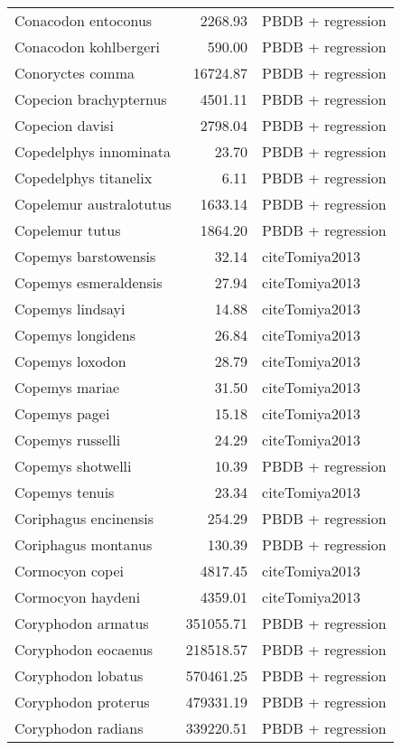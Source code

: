 \begin{table}[ht]
\begin{tabular}{lrl}
  Conacodon entoconus & 2268.93 & PBDB + regression \\ 
  Conacodon kohlbergeri & 590.00 & PBDB + regression \\ 
  Conoryctes comma & 16724.87 & PBDB + regression \\ 
  Copecion brachypternus & 4501.11 & PBDB + regression \\ 
  Copecion davisi & 2798.04 & PBDB + regression \\ 
  Copedelphys innominata & 23.70 & PBDB + regression \\ 
  Copedelphys titanelix & 6.11 & PBDB + regression \\ 
  Copelemur australotutus & 1633.14 & PBDB + regression \\ 
  Copelemur tutus & 1864.20 & PBDB + regression \\ 
  Copemys barstowensis & 32.14 & cite{Tomiya2013} \\ 
  Copemys esmeraldensis & 27.94 & cite{Tomiya2013} \\ 
  Copemys lindsayi & 14.88 & cite{Tomiya2013} \\ 
  Copemys longidens & 26.84 & cite{Tomiya2013} \\ 
  Copemys loxodon & 28.79 & cite{Tomiya2013} \\ 
  Copemys mariae & 31.50 & cite{Tomiya2013} \\ 
  Copemys pagei & 15.18 & cite{Tomiya2013} \\ 
  Copemys russelli & 24.29 & cite{Tomiya2013} \\ 
  Copemys shotwelli & 10.39 & PBDB + regression \\ 
  Copemys tenuis & 23.34 & cite{Tomiya2013} \\ 
  Coriphagus encinensis & 254.29 & PBDB + regression \\ 
  Coriphagus montanus & 130.39 & PBDB + regression \\ 
  Cormocyon copei & 4817.45 & cite{Tomiya2013} \\ 
  Cormocyon haydeni & 4359.01 & cite{Tomiya2013} \\ 
  Coryphodon armatus & 351055.71 & PBDB + regression \\ 
  Coryphodon eocaenus & 218518.57 & PBDB + regression \\ 
  Coryphodon lobatus & 570461.25 & PBDB + regression \\ 
  Coryphodon proterus & 479331.19 & PBDB + regression \\ 
  Coryphodon radians & 339220.51 & PBDB + regression \\ 

\end{tabular}
\end{table}
